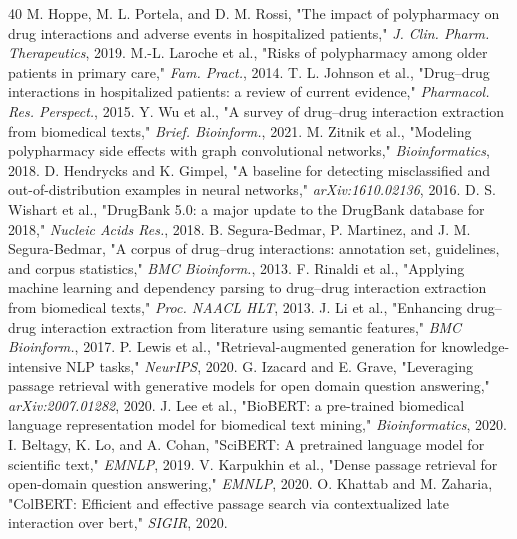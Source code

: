 \documentclass[conference]{IEEEtran}
\begin{document}
\begin{thebibliography}{40}
M. Hoppe, M. L. Portela, and D. M. Rossi, "The impact of polypharmacy on drug interactions and adverse events in hospitalized patients," \emph{J. Clin. Pharm. Therapeutics}, 2019.
M.-L. Laroche et al., "Risks of polypharmacy among older patients in primary care," \emph{Fam. Pract.}, 2014.
T. L. Johnson et al., "Drug--drug interactions in hospitalized patients: a review of current evidence," \emph{Pharmacol. Res. Perspect.}, 2015.
Y. Wu et al., "A survey of drug--drug interaction extraction from biomedical texts," \emph{Brief. Bioinform.}, 2021.
M. Zitnik et al., "Modeling polypharmacy side effects with graph convolutional networks," \emph{Bioinformatics}, 2018.
D. Hendrycks and K. Gimpel, "A baseline for detecting misclassified and out-of-distribution examples in neural networks," \emph{arXiv:1610.02136}, 2016.
D. S. Wishart et al., "DrugBank 5.0: a major update to the DrugBank database for 2018," \emph{Nucleic Acids Res.}, 2018.
B. Segura-Bedmar, P. Martinez, and J. M. Segura-Bedmar, "A corpus of drug--drug interactions: annotation set, guidelines, and corpus statistics," \emph{BMC Bioinform.}, 2013.
F. Rinaldi et al., "Applying machine learning and dependency parsing to drug--drug interaction extraction from biomedical texts," \emph{Proc. NAACL HLT}, 2013.
J. Li et al., "Enhancing drug--drug interaction extraction from literature using semantic features," \emph{BMC Bioinform.}, 2017.
P. Lewis et al., "Retrieval-augmented generation for knowledge-intensive NLP tasks," \emph{NeurIPS}, 2020.
G. Izacard and E. Grave, "Leveraging passage retrieval with generative models for open domain question answering," \emph{arXiv:2007.01282}, 2020.
J. Lee et al., "BioBERT: a pre-trained biomedical language representation model for biomedical text mining," \emph{Bioinformatics}, 2020.
I. Beltagy, K. Lo, and A. Cohan, "SciBERT: A pretrained language model for scientific text," \emph{EMNLP}, 2019.
V. Karpukhin et al., "Dense passage retrieval for open-domain question answering," \emph{EMNLP}, 2020.
O. Khattab and M. Zaharia, "ColBERT: Efficient and effective passage search via contextualized late interaction over bert," \emph{SIGIR}, 2020.

\end{thebibliography}
\end{document}
